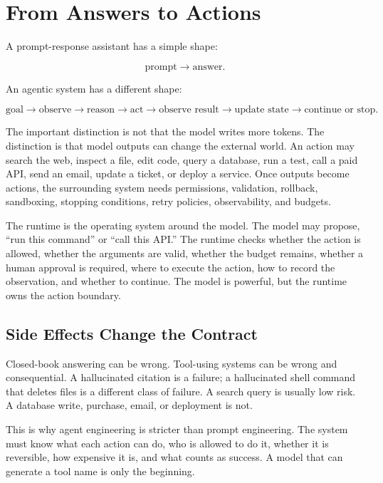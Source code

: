 \section{From Answers to Actions}
\label{sec:ch21-answers-to-actions}

A prompt-response assistant has a simple shape:

\[
\text{prompt} \rightarrow \text{answer}.
\]

An agentic system has a different shape:

\[
\text{goal} \rightarrow \text{observe} \rightarrow \text{reason} \rightarrow \text{act} \rightarrow \text{observe result} \rightarrow \text{update state} \rightarrow \text{continue or stop}.
\]

The important distinction is not that the model writes more tokens. The distinction is that model outputs can change the external world. An action may search the web, inspect a file, edit code, query a database, run a test, call a paid API, send an email, update a ticket, or deploy a service. Once outputs become actions, the surrounding system needs permissions, validation, rollback, sandboxing, stopping conditions, retry policies, observability, and budgets.

The runtime is the operating system around the model. The model may propose, ``run this command'' or ``call this API.'' The runtime checks whether the action is allowed, whether the arguments are valid, whether the budget remains, whether a human approval is required, where to execute the action, how to record the observation, and whether to continue. The model is powerful, but the runtime owns the action boundary.

\subsection{Side Effects Change the Contract}

Closed-book answering can be wrong. Tool-using systems can be wrong and consequential. A hallucinated citation is a failure; a hallucinated shell command that deletes files is a different class of failure. A search query is usually low risk. A database write, purchase, email, or deployment is not.

This is why agent engineering is stricter than prompt engineering. The system must know what each action can do, who is allowed to do it, whether it is reversible, how expensive it is, and what counts as success. A model that can generate a tool name is only the beginning.

